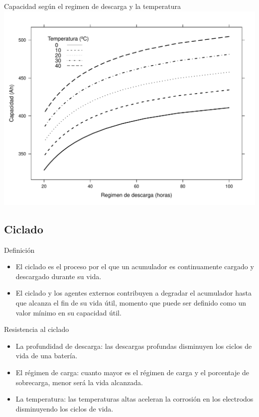 \documentclass[xcolor={usenames,svgnames,dvipsnames}]{beamer}
\begin{document}
\begin{frame}[label=sec-2-3-3]{Capacidad según el regimen de descarga y la temperatura}
\includegraphics[width=.9\linewidth]{../figs/Bateria_Capacidad.pdf}
\end{frame}

\subsection{Ciclado}
\label{sec-2-4}
\begin{frame}[label=sec-2-4-1]{Definición}
\begin{itemize}
\item \alert{El ciclado es el proceso por el que un acumulador es continuamente cargado y descargado durante su vida.}

\item El ciclado y los agentes externos contribuyen a degradar el acumulador hasta que alcanza el fin de su vida útil, momento que puede ser definido como un valor mínimo en su capacidad útil.
\end{itemize}
\end{frame}

\begin{frame}[label=sec-2-4-2]{Resistencia al ciclado}
\begin{itemize}
\item \alert{La profundidad de descarga}: las descargas profundas disminuyen los ciclos de vida de una batería.

\item \alert{El régimen de carga}: cuanto mayor es el régimen de carga y el porcentaje de sobrecarga, menor será la vida alcanzada.

\item \alert{La temperatura}: las temperaturas altas aceleran la corrosión en los electrodos disminuyendo los ciclos de vida.
\end{itemize}
\end{frame}
\end{document}

